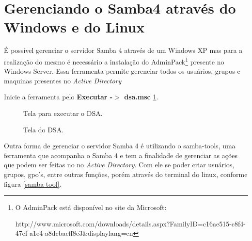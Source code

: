 \section{Gerenciando o Samba4 através do Windows e do Linux}

É possível gerenciar o servidor Samba 4 através de um Windows XP mas para a realização do mesmo é necessário a instalação do AdminPack\footnote[4]{O AdminPack está disponível no site da Microsoft:

http://www.microsoft.com/downloads/details.aspx?FamilyID=c16ae515-c8f4-47ef-a1e4-a8dcbacff8e3\&displaylang=en} presente no Windows Server. Essa ferramenta permite gerenciar todos os usuários, grupos e maquinas presentes no \textit{Active Directory}

Inicie a ferramenta pelo \textbf{Executar -$>$ dsa.msc} \ref{dsa}.

\begin{figure}[ht]
   	\centering
   	\caption{Tela para executar o DSA.}
    \label{dsa}
\end{figure}
 

\begin{figure}[h!]
   	\centering
   	\caption{Tela do DSA.}
    \label{tela_dsa}
\end{figure}

Outra forma de gerenciar o servidor Samba 4 é utilizando o samba-tools, uma ferramenta que acompanha o Samba 4 e tem a finalidade de gerenciar as ações que podem ser feitas no no \textit{Active Directory}. Com ele se poder criar usuários, grupos, gpo's, entre outras funções, porém através do terminal do linux, conforme figura \ref{samba-tool}.

